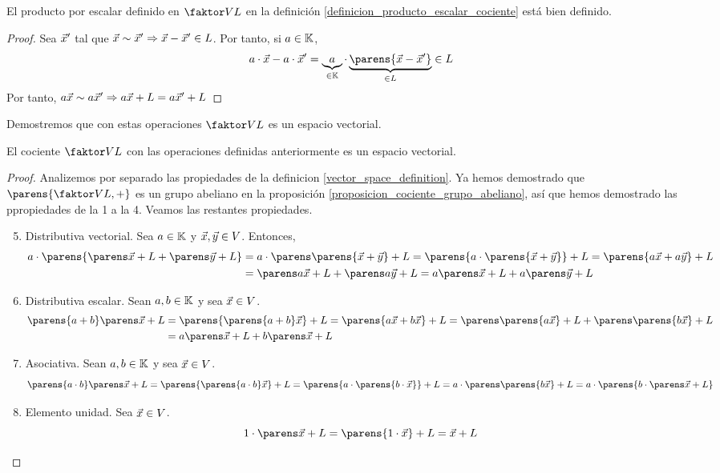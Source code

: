 \documentclass[../algebra_lineal.tex]{subfiles}
\begin{document}
\begin{proposition}
    El producto por escalar definido en $\qs{V}{L}$ en la definición \ref{definicion_producto_escalar_cociente} está bien definido. 
\end{proposition}

\begin{proof}
    Sea $\vec{x}'$ tal que $\vec{x} \sim \vec{x}' \Rightarrow \vec{x} - \vec{x}' \in L$. Por tanto, si $a \in \mathbb{K}$,
    \[
        a \cdot \vx - a \cdot \vx' = \underbrace{a}_{\in \K} \cdot \underbrace{\parens{\vx - \vx'}}_{\in L} \in L
    \]
    Por tanto, $a \vec{x} \sim a \vec{x}' \Rightarrow a \vec{x} + L = a \vec{x}' + L$
\end{proof}

Demostremos que con estas operaciones $\qs{V}{L}$ es un espacio vectorial.

\begin{proposition}
    El cociente $\qs{V}{L}$ con las operaciones definidas anteriormente es un espacio vectorial.    
\end{proposition}
\begin{proof}
    Analizemos por separado las propiedades de la definicion \ref{vector_space_definition}. Ya hemos demostrado que $\parens{\qs{V}{L}, +}$ es un grupo abeliano en la proposición \ref{proposicion_cociente_grupo_abeliano}, así que hemos demostrado las ppropiedades de la 1 a la 4. Veamos las restantes propiedades.
    \begin{enumerate}
        \setcounter{enumi}{4}
        \item Distributiva vectorial. Sea $a \in \mathbb{K}$ y $\vec{x}, \vec{y} \in V$. Entonces,
            \begin{align*}
                a \cdot \parens{\ecl{\vx} + \ecl{\vy}} &= a \cdot \ecl{\parens{\vx + \vy}} = \parens{a \cdot \parens{\vx + \vy}} + L = \parens{a\vx + a\vy} + L \\
                &= \ecl{a\vx} + \ecl{a\vy} = a \ecl{\vx} + a\ecl{\vy}
            \end{align*}
        \item Distributiva escalar. Sean $a, b \in \mathbb{K}$ y sea $\vec{x} \in V$. 
        \begin{align*}
            \parens{a+b}\ecl{\vx} &= \parens{\parens{a+b}\vx} + L = \parens{a \vx + b \vx} + L = \ecl{\parens{a \vx}} + \ecl{\parens{b \vx}} \\
            &= a \ecl{\vx} + b \ecl{\vx}
        \end{align*}
        \item Asociativa. Sean $a, b \in \mathbb{K}$ y sea $\vec{x} \in V$.
        \[
            \parens{a \cdot b} \ecl{\vx} = \parens{\parens{a \cdot b}\vx} + L = \parens{a \cdot \parens{b \cdot \vx}} + L = a \cdot \ecl{\parens{b \vx}} = a \cdot \parens{b \cdot \ecl{\vx}}
        \]
        \item Elemento unidad. Sea $\vec{x} \in V$.
        \[
            1 \cdot \ecl{\vx} = \parens{1 \cdot \vx} + L = \vx + L
        \]
    \end{enumerate}
\end{proof}
\end{document}
